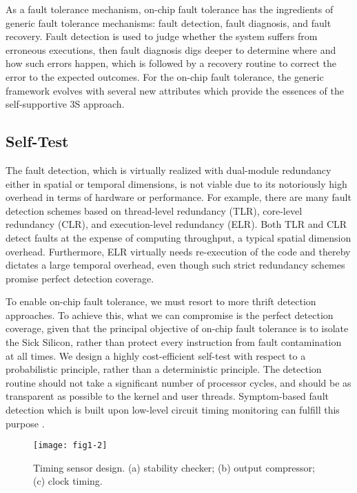 As a fault tolerance mechanism, on-chip fault tolerance has the ingredients of generic fault tolerance mechanisms: fault detection, fault diagnosis, and fault recovery. Fault detection is used to judge whether the system suffers from erroneous executions, then fault diagnosis digs deeper to determine where and how such errors happen, which is followed by a recovery routine to correct the error to the expected outcomes. For the on-chip fault tolerance, the generic framework evolves with several new attributes which provide the essences of the self-supportive 3S approach.

\subsection{Self-Test}
The fault detection, which is virtually realized with dual-module redundancy either in spatial or temporal dimensions, is not viable due to its notoriously high overhead in terms of hardware or performance. For example, there are many fault detection schemes based on thread-level redundancy (TLR), core-level redundancy (CLR), and execution-level redundancy (ELR). Both TLR and CLR detect faults at the expense of computing throughput, a typical spatial dimension overhead. Furthermore, ELR virtually needs re-execution of the code and thereby dictates a large temporal overhead, even though such strict redundancy schemes promise perfect detection coverage.

To enable on-chip fault tolerance, we must resort to more thrift detection approaches. To achieve this, what we can compromise is the perfect detection coverage, given that the principal objective of on-chip fault tolerance is to isolate the Sick Silicon, rather than protect every instruction from fault contamination at all times. We design a highly cost-efficient self-test with respect to a probabilistic principle, rather than a deterministic principle. The detection routine should not take a significant number of processor cycles, and should be as transparent as possible to the kernel and user threads. Symptom-based fault detection which is built upon low-level circuit timing monitoring can fulfill this purpose \cite{yan2010svfd, wang2006restore}. 

\begin{figure}[t]
\centering
\texttt{[image: fig1-2]}
\caption{Timing sensor design. (a) stability checker; (b) output compressor; (c) clock timing.}
\label{fig:timing-sensor} 
\end{figure}


